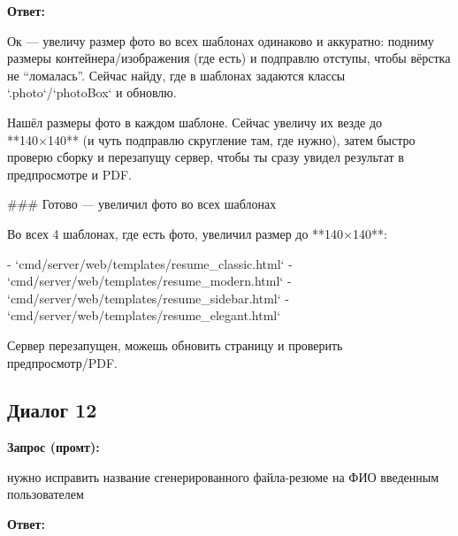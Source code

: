 \documentclass[a4paper, 14pt]{extarticle} %
\begin{document}
\textbf{Ответ:}

\begin{AnswerBlock}

Ок — увеличу размер фото во всех шаблонах одинаково и аккуратно: подниму размеры контейнера/изображения (где есть) и подправлю отступы, чтобы вёрстка не “ломалась”. Сейчас найду, где в шаблонах задаются классы `.photo`/`photoBox` и обновлю.

Нашёл размеры фото в каждом шаблоне. Сейчас увеличу их везде до **140×140** (и чуть подправлю скругление там, где нужно), затем быстро проверю сборку и перезапущу сервер, чтобы ты сразу увидел результат в предпросмотре и PDF.

### Готово — увеличил фото во всех шаблонах

Во всех 4 шаблонах, где есть фото, увеличил размер до **140×140**:

- `cmd/server/web/templates/resume_classic.html`
- `cmd/server/web/templates/resume_modern.html`
- `cmd/server/web/templates/resume_sidebar.html`
- `cmd/server/web/templates/resume_elegant.html`

Сервер перезапущен, можешь обновить страницу и проверить предпросмотр/PDF.

\end{AnswerBlock}

\subsection*{Диалог 12}

\textbf{Запрос (промт):}

\begin{PromptBlock}

нужно исправить название сгенерированного файла-резюме на ФИО введенным пользователем

\end{PromptBlock}

\textbf{Ответ:}
\end{document}
